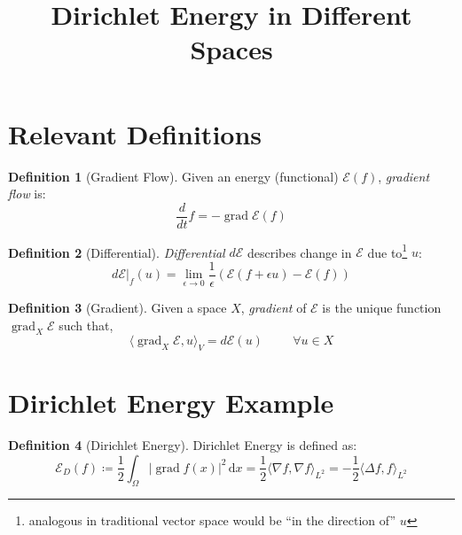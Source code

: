 \documentclass[a4paper]{article}
\title{Dirichlet Energy in Different Spaces}
\author{ }
\newcommand{\dx}{\, \text{d} x}
\theoremstyle{definition}
\newtheorem{definition}{Definition}
\DeclareMathOperator{\grad}{grad}
\begin{document}
\maketitle
\section{Relevant Definitions}
\begin{definition}[Gradient Flow]
    Given an energy (functional) $\mathcal{E}(f)$, \emph{gradient flow} is:
    \begin{equation}
        \frac{d}{dt}f = - \grad \mathcal{E}(f)
        \label{equ: Gradient Flow}
    \end{equation}
\end{definition}

\begin{definition}[Differential]
    \emph{Differential} $d\mathcal{E}$ describes change in $\mathcal{E}$ due to\footnote{analogous in traditional vector space would be ``in the direction of'' $u$} $u$:
    \begin{equation}
        d \mathcal{E}|_f(u) = \lim_{\epsilon \rightarrow 0} \frac{1}{\epsilon} \left( \mathcal{E}(f+\epsilon u) - \mathcal{E}(f) \right)
        \label{equ: Differential}
    \end{equation}
\end{definition}

\begin{definition}[Gradient]
    Given a space $X$, \emph{gradient} of $\mathcal{E}$ is the unique function $\grad_X \mathcal{E}$ such that,
    \begin{equation}
        \langle \grad_X \mathcal{E}, u \rangle_V = d \mathcal{E}(u) \hspace{1cm} \forall u \in X
        \label{equ: Gradient}
    \end{equation}
\end{definition}

\section{Dirichlet Energy Example}

\begin{definition}[Dirichlet Energy]
    Dirichlet Energy is defined as:
    \begin{equation}
        \mathcal{E}_D(f) \coloneqq \frac{1}{2} \int_{\Omega} |\grad f(x)|^2 \dx
        = \frac{1}{2} \langle \nabla f, \nabla f \rangle_{L^2}
        = -\frac{1}{2} \langle \Delta f, f \rangle_{L^2}
        \label{equ: Dirichlet Energy}
    \end{equation}
\end{definition}
\end{document}
